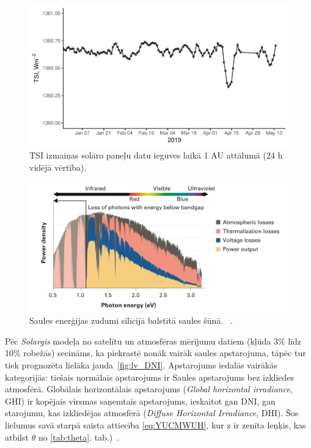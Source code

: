 \begin{figure}[h]
    \centering
    \includegraphics[width=\linewidth]{figures/misc/TSI.pdf}
    \caption{TSI izmaiņas solāro paneļu datu ieguves laikā 1 AU attālumā (24 h vidējā vērtība)\cite{TSIdata}.}
    \label{fig:TSI2}
\end{figure}


\begin{figure}[h]
    \centering
    \includegraphics[width=\linewidth]{figures/misc/energyLosses.png}
    \caption{Saules enerģijas zudumi silīcijā balstītā saules šūnā.  ~\cite{Sivaram}.}
    \label{fig:zudumi}
\end{figure}


Pēc \emph{Solargis} modeļa no satelītu un atmosfēras mērījumu datiem (kļūda 3\% līdz 10\% robežās) secināms, ka piekrastē nonāk vairāk saules apstarojuma, tāpēc tur tiek prognozēta lielāka jauda~\ref{fig:lv_DNI}. Apstarojums iedalās vairākās kategorijās:
tiešais normālais apstarojums ir Saules apstarojums bez izkliedes atmosfērā. Globālais horizontālais apstarojums (\textit{Global horizontal irradiance}, GHI) ir kopējais virsmas saņemtais apstarojums, ieskaitot gan DNI, gan starojumu, kas izkliedējas atmosfērā (\textit{Diffuse Horizontal Irradiance}, DHI). Šos lielumus savā starpā saista attiecība \ref{eq:YUCMWUH}, kur z ir zenīta leņķis, kas atbilst $\theta$ no \ref{tab:theta}. tab.)~\cite{Sivaram}.

